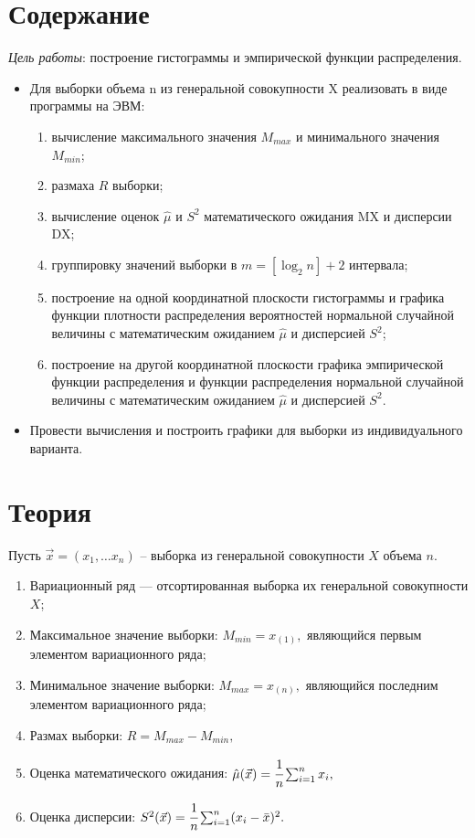 
\chapter{Содержание}

\textit{Цель работы}: построение гистограммы и эмпирической функции распределения.
\begin{itemize}
	\item Для выборки объема n из генеральной совокупности X реализовать в виде программы на ЭВМ:
	\begin{enumerate}
		\item вычисление максимального значения $M_{max}$ и минимального значения $M_{min}$;
		\item размаха $R$ выборки;
		\item вычисление оценок $\hat{\mu}$ и $S^2$ математического ожидания MX и дисперсии DX;
		\item группировку значений выборки в $m = [\log_2n] + 2$ интервала;
		\item построение на одной координатной плоскости гистограммы и графика функции плотности распределения вероятностей нормальной случайной величины с математическим ожиданием $\hat{\mu}$ и дисперсией $S^2$;
		\item построение на другой координатной плоскости графика эмпирической функции распределения и функции распределения нормальной случайной величины с математическим ожиданием $\hat{\mu}$ и дисперсией $S^2$.
	\end{enumerate}
	\item Провести вычисления и построить графики для выборки из индивидуального варианта.
\end{itemize}


\chapter{Теория}
Пусть $\vec{x} = (x_1, \dots x_n)$ -- выборка из генеральной совокупности $X$ объема $n$.
\begin{enumerate}[wide=0pt]
	\item Вариационный ряд --- отсортированная выборка их генеральной совокупности $X$;
	
	\item Максимальное значение выборки: $M_{min} = x_{(1)},$ являющийся первым элементом вариационного ряда;
	
	\item Минимальное значение выборки: $M_{max} = x_{(n)},$ являющийся последним элементом вариационного ряда;
	
	\item Размах выборки: $R = M_{max} - M_{min},$
	
	\item Оценка математического ожидания: $\hat{\mu}(\vec{x}) = \cfrac{1}{n}\sum_{i = 1}^{n}x_i,$
	
	\item Оценка дисперсии: $S^2(\vec{x}) = \cfrac{1}{n}\sum_{i = 1}^{n}(x_i - \bar{x})^2.$
\end{enumerate}


